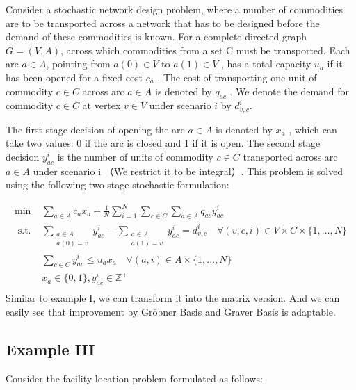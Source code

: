 \documentclass{article}
\theoremstyle{plain}
\theoremstyle{definition}
\begin{document}
\begin{propsition}
Consider a stochastic network design problem, where a number of commodities are to be transported
across a network that has to be designed before the demand of these commodities is known. For a complete directed graph  $G=(V, A) $, across which commodities from a set  C  must be transported. Each arc  $a \in A $, pointing from  $a(0) \in V$  to  $a(1) \in V$ , has a total capacity  $u_{a}$  if it has been opened for a fixed cost  $c_{a}$ . The cost of transporting one unit of commodity  $c \in C$  across arc  $a \in A$  is denoted by  $q_{a c}$ . We denote the demand for commodity  $c \in C$  at vertex $ v \in V$  under scenario  $i$  by  $d_{v, c}^{i}$.

The first stage decision of opening the arc  $a \in A$  is denoted by  $x_{a}$ , which can take two values: 0 if the arc is closed and 1 if it is open. The second stage decision  $y_{a c}^{i}$  is the number of units of commodity  $c \in C$  transported across arc  $a \in A$  under scenario  i （We restrict it to be integral）. This problem is solved using the following two-stage stochastic formulation:

\begin{align*}
\min & \sum_{a \in A} c_{a} x_{a}+\frac{1}{N} \sum_{i=1}^{N} \sum_{c \in C} \sum_{a \in A} q_{a c} y_{a c}^{i}  \\
\text { s.t. }  & \sum_{\substack{a \in A \\ a(0)=v}} y_{a c}^{i}-\sum_{\substack{a \in A \\ a(1)=v}} y_{a c}^{i}=d_{v, c}^{i} \quad  \forall(v, c, i) \in V \times C \times\{1, \ldots, N\}  \\
& \sum_{c \in C} y_{a c}^{i} \leq u_{a} x_{a} \quad  \forall(a, i) \in A \times\{1, \ldots, N\}\\
& x_{a} \in\{0,1\}, y_{a c}^{i} \in\mathbb{Z}^{+} \\
\end{align*}
Similar to example I, we can transform it into the matrix version. And we can easily see that improvement by Gröbner Basis and Graver Basis is adaptable.

\subsection{Example III}
Consider the facility location problem formulated as follows:


\end{propsition}
\end{document}
